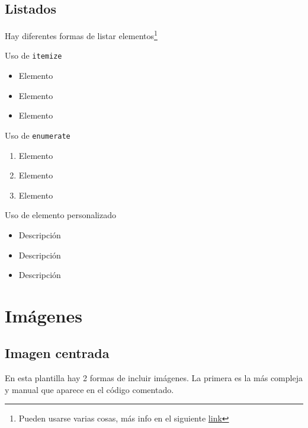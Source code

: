 \subsection{Listados}
Hay diferentes formas de listar elementos\footnote{Pueden usarse varias cosas, más info en el siguiente \href{https://es.overleaf.com/learn/latex/Lists}{link}}
\begin{multicols}{3}
    Uso de \texttt{itemize}
    \begin{itemize}
        \centering
        \item Elemento
        \item Elemento
        \item Elemento
    \end{itemize}
    
    \columnbreak %
    
    Uso de \texttt{enumerate}
    \begin{enumerate}
        \centering
        \item Elemento
        \item Elemento
        \item Elemento
    \end{enumerate}
    
    \columnbreak%
    
    Uso de elemento personalizado
    \begin{itemize}[$\blacksquare$] %
        \centering
        \item Descripción
        \item Descripción
        \item Descripción
    \end{itemize}
\end{multicols}


\newpage
\section{Imágenes}
\subsection{Imagen centrada}
En esta plantilla hay 2 formas de incluir imágenes. La primera es la más compleja y manual que aparece en el código comentado.

